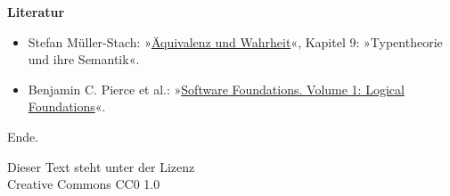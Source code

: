 \documentclass[9pt]{beamer}
\newcommand{\modest}[1]{{\small\color{gray}#1}}
\newcommand{\strong}[1]{\textsf{\textbf{#1}}}
\begin{document}
\begin{frame}
\strong{Literatur}

\begin{itemize}
\item Stefan Müller-Stach: »\href{https://export.arxiv.org/abs/1805.05419}%
{Äquivalenz und Wahrheit}«, Kapitel 9:
»Typentheorie und ihre Semantik«.
\item Benjamin C. Pierce et al.:
»\href{https://softwarefoundations.cis.upenn.edu/lf-current/index.html}%
{Software Foundations. Volume 1: Logical Foundations}«.
\end{itemize}
\end{frame}

\begin{frame}
Ende.

\vfill
\modest{Dieser Text steht unter der Lizenz\\
Creative Commons CC0 1.0}
\end{frame}
\end{document}
